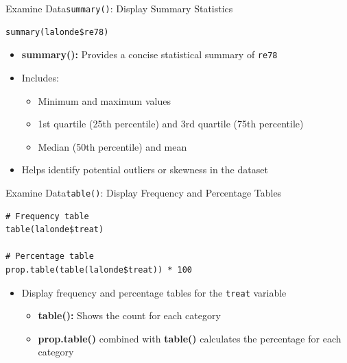 \documentclass[dvipsnames,hyperref={pdfpagelabels=false}]{beamer}
\begin{document}
\begin{frame}[fragile]{Examine Data}{\texttt{summary()}: Display Summary Statistics}
\begin{lstlisting}
summary(lalonde$re78)
\end{lstlisting}
\begin{itemize}
	\vspace{0.2cm}
	\item \textbf{summary():} Provides a concise statistical summary of \texttt{re78}
	\vspace{0.2cm}
	\item Includes:
	\begin{itemize}
		\item Minimum and maximum values
		\vspace{0.2cm}
		\item 1st quartile (25th percentile) and 3rd quartile (75th percentile)
		\vspace{0.2cm}
		\item Median (50th percentile) and mean
	\end{itemize}
	\vspace{0.2cm}
	\item Helps identify potential outliers or skewness in the dataset
\end{itemize}
\end{frame}


\begin{frame}[fragile]{Examine Data}{\texttt{table()}: Display Frequency and Percentage Tables}
\begin{lstlisting}
# Frequency table
table(lalonde$treat)

# Percentage table
prop.table(table(lalonde$treat)) * 100
\end{lstlisting}
\begin{itemize}
	\vspace{0.2cm}
	\item Display frequency and percentage tables for the \texttt{treat} variable
	\vspace{0.2cm}
	\begin{itemize}
		\item \textbf{table():} Shows the count for each category
		\vspace{0.2cm}
		\item \textbf{prop.table()} combined with \textbf{table()} calculates the percentage for each category
	\end{itemize}
\end{itemize}
\end{frame}
\end{document}
